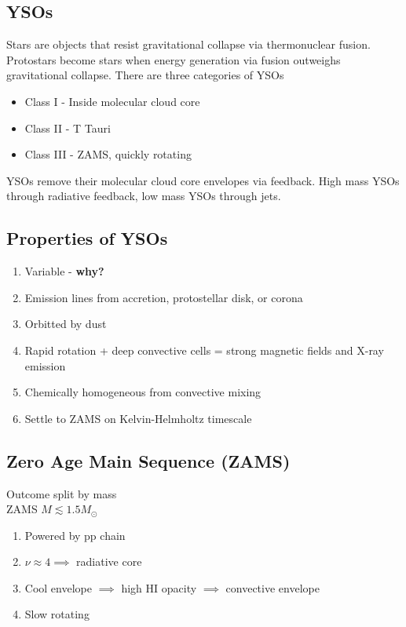 \documentclass{article}
\begin{document}
\subsection{YSOs}

Stars are objects that resist gravitational collapse via thermonuclear fusion. Protostars become stars when energy generation via fusion outweighs gravitational collapse. There are three categories of YSOs

\begin{itemize}
    \item Class I - Inside molecular cloud core
    \item Class II - T Tauri
    \item Class III - ZAMS, quickly rotating
\end{itemize}

YSOs remove their molecular cloud core envelopes via feedback. High mass YSOs through radiative feedback, low mass YSOs through jets.

\subsection{Properties of YSOs}
\begin{enumerate}
    \item Variable - \textbf{why?}
    \item Emission lines from accretion, protostellar disk, or corona
    \item Orbitted by dust
    \item Rapid rotation + deep convective cells = strong magnetic fields and X-ray emission
    \item Chemically homogeneous from convective mixing
    \item Settle to ZAMS on Kelvin-Helmholtz timescale
\end{enumerate}

\subsection{Zero Age Main Sequence (ZAMS)}
Outcome split by mass\\

ZAMS $M \lesssim 1.5 M_\odot$

\begin{enumerate}
    \item Powered by pp chain
    \item $\nu \approx 4 \implies$ radiative core
    \item Cool envelope $\implies$ high HI opacity $\implies$ convective envelope
    \item Slow rotating
\end{enumerate}
\end{document}
